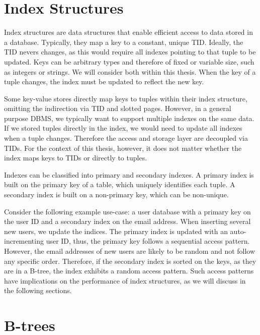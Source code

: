 \section{Index Structures}
Index structures are data structures that enable efficient access to data stored in a database.
Typically, they map a key to a constant, unique \ac{TID}.
Ideally, the \ac{TID} nevers changes, as this would require all indexes pointing to that tuple to be updated.
Keys can be arbitrary types and therefore of fixed or variable size, such as integers or strings.
We will consider both within this thesis.
When the key of a tuple changes, the index must be updated to reflect the new key.

Some key-value stores directly map keys to tuples within their index structure, omitting the indirection via \ac{TID} and slotted pages.
However, in a general purpose \ac{DBMS}, we typically want to support multiple indexes on the same data.
If we stored tuples directly in the index, we would need to update all indexes when a tuple changes.
Therefore the access and storage layer are decoupled via \ac{TID}s.
For the context of this thesis, however, it does not matter whether the index maps keys to \ac{TID}s or directly to tuples.

Indexes can be classified into primary and secondary indexes.
A primary index is built on the primary key of a table, which uniquely identifies each tuple.
A secondary index is built on a non-primary key, which can be non-unique.

Consider the following example use-case: a user database with a primary key on the user ID and a secondary index on the email address.
When inserting several new users, we update the indices.
The primary index is updated with an auto-incrementing user ID, thus, the primary key follows a sequential access pattern.
However, the email addresses of new users are likely to be random and not follow any specific order.
Therefore, if the secondary index is sorted on the keys, as they are in a B-tree, the index exhibits a random access pattern.
Such access patterns have implications on the performance of index structures, as we will discuss in the following sections.

\section{B-trees}

